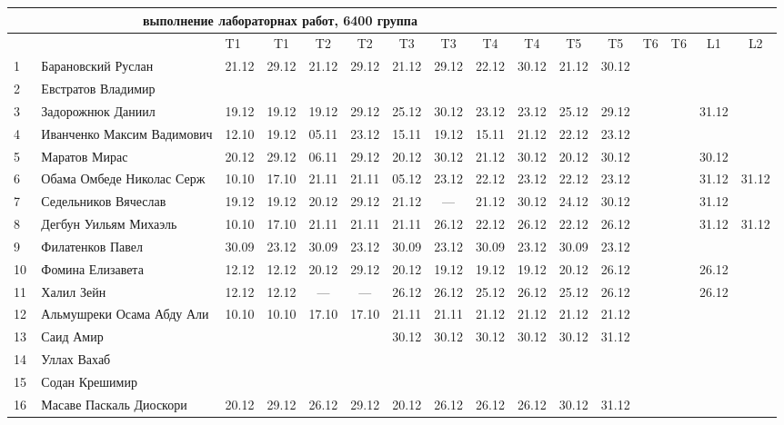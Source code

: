 \documentclass[a4paper,landscape,11pt]{article}
\begin{document}
\newpage
%
\begin{tabular}{l|llccc|cccc|cccccc}
\multicolumn{10}{c}{выполнение лабораторнах работ, 6400 группа} \\
\toprule
&&T1&T1& T2&T2& T3&T3& T4&T4&T5&T5&T6&T6&L1&L2\\
\midrule
1\,&  Барановский Руслан         &21.12& 29.12& 21.12& 29.12& 21.12& 29.12& 22.12& 30.12& 21.12& 30.12\\
2\,&  Евстратов Владимир         &&&&&&&&\\
3\,&  Задорожнюк Даниил          &19.12& 19.12& 19.12& 29.12& 25.12& 30.12& 23.12& 23.12& 25.12& 29.12&&&31.12\\ %
4\,&  Иванченко Максим Вадимович &12.10& 19.12& 05.11& 23.12& 15.11& 19.12& 15.11& 21.12& 22.12& 23.12\\ %
5\,&  Маратов Мирас              &20.12& 29.12& 06.11& 29.12& 20.12& 30.12& 21.12& 30.12& 20.12& 30.12&&&30.12\\ %
\midrule
6\,&  Обама Омбеде Николас Серж  &10.10& 17.10& 21.11& 21.11& 05.12& 23.12& 22.12& 23.12& 22.12& 23.12&&&31.12&31.12\\   %
7\,&  Седельников Вячеслав       &19.12& 19.12& 20.12& 29.12& 21.12&  --- & 21.12& 30.12& 24.12& 30.12&&&31.12\\   %
8\,&  Дегбун Уильям Михаэль      &10.10& 17.10& 21.11& 21.11& 21.11& 26.12& 22.12& 26.12& 22.12& 26.12&&&31.12&31.12\\   %
9\,&  Филатенков Павел           &30.09 &23.12& 30.09& 23.12& 30.09& 23.12& 30.09& 23.12& 30.09& 23.12\\
10\,& Фомина Елизавета           &12.12& 12.12& 20.12& 29.12& 20.12& 19.12& 19.12& 19.12& 20.12& 26.12&&& 26.12 \\  %
\midrule
11\,& Халил Зейн                 &12.12& 12.12&  --- &  --- & 26.12& 26.12& 25.12& 26.12& 25.12& 26.12&&& 26.12\\ %
12\,& Альмушреки Осама Абду Али  &10.10& 10.10& 17.10& 17.10& 21.11& 21.11& 21.12& 21.12& 21.12& 21.12\\   %
13\,& Саид Амир                  &     &      &      &      & 30.12& 30.12& 30.12& 30.12& 30.12& 31.12\\ %
14\,& Уллах Вахаб                &&&&&&&&\\
15\,& Содан Крешимир             &&&&&&&&\\
16\,& Масаве Паскаль Диоскори    &20.12& 29.12& 26.12& 29.12& 20.12& 26.12& 26.12& 26.12& 30.12& 31.12    \\ %
\bottomrule
\end{tabular}
\end{document}
